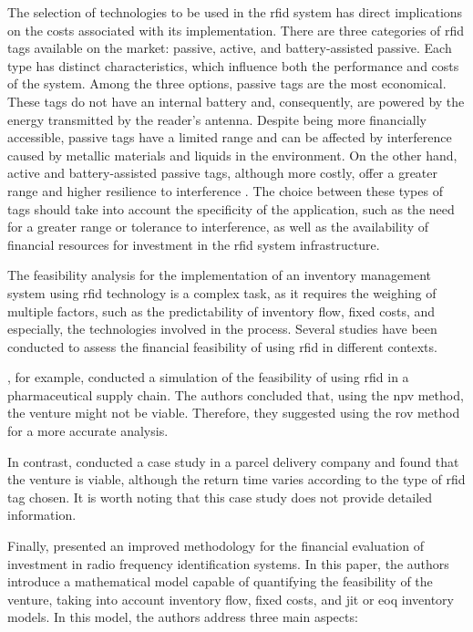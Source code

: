 The selection of technologies to be used in the \acrshort{rfid} system has direct implications on the costs associated with its implementation. There are three categories of \acrshort{rfid} tags available on the market: passive, active, and battery-assisted passive. Each type has distinct characteristics, which influence both the performance and costs of the system. Among the three options, passive tags are the most economical. These tags do not have an internal battery and, consequently, are powered by the energy transmitted by the reader's antenna. Despite being more financially accessible, passive tags have a limited range and can be affected by interference caused by metallic materials and liquids in the environment. On the other hand, active and battery-assisted passive tags, although more costly, offer a greater range and higher resilience to interference \cite{Lee2012}. The choice between these types of tags should take into account the specificity of the application, such as the need for a greater range or tolerance to interference, as well as the availability of financial resources for investment in the \acrshort{rfid} system infrastructure.


The feasibility analysis for the implementation of an inventory management system using \acrshort{rfid} technology is a complex task, as it requires the weighing of multiple factors, such as the predictability of inventory flow, fixed costs, and especially, the technologies involved in the process. Several studies have been conducted to assess the financial feasibility of using \acrshort{rfid} in different contexts.

\textcite{Yue2011}, for example, conducted a simulation of the feasibility of using \acrshort{rfid} in a pharmaceutical supply chain. The authors concluded that, using the \acrfull{npv} method, the venture might not be viable. Therefore, they suggested using the \acrfull{rov} method for a more accurate analysis.

In contrast, \textcite{Ustundag2007} conducted a case study in a parcel delivery company and found that the venture is viable, although the return time varies according to the type of \acrshort{rfid} tag chosen. It is worth noting that this case study does not provide detailed information.

Finally, \textcite{Lee2012} presented an improved methodology for the financial evaluation of investment in radio frequency identification systems. In this paper, the authors introduce a mathematical model capable of quantifying the feasibility of the venture, taking into account inventory flow, fixed costs, and \acrfull{jit} or \acrfull{eoq} inventory models. In this model, the authors address three main aspects:

